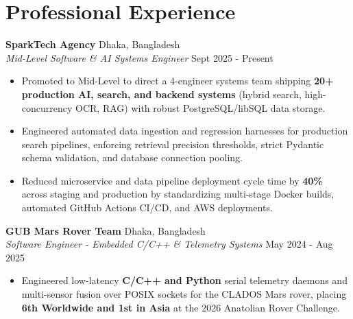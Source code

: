 \documentclass[9.5pt,a4paper]{article}
\begin{document}
\section*{Professional Experience}
\noindent
\textbf{SparkTech Agency} \hfill Dhaka, Bangladesh\\
\textit{Mid-Level Software & AI Systems Engineer} \hfill Sept 2025 - Present
\begin{itemize}
    \item Promoted to Mid-Level to direct a 4-engineer systems team shipping \textbf{20+ production AI, search, and backend systems} (hybrid search, high-concurrency OCR, RAG) with robust PostgreSQL/libSQL data storage.
    \item Engineered automated data ingestion and regression harnesses for production search pipelines, enforcing retrieval precision thresholds, strict Pydantic schema validation, and database connection pooling.
    \item Reduced microservice and data pipeline deployment cycle time by \textbf{40\%} across staging and production by standardizing multi-stage Docker builds, automated GitHub Actions CI/CD, and AWS deployments.
\end{itemize}
\vspace{0.6pt}
\noindent
\textbf{GUB Mars Rover Team} \hfill Dhaka, Bangladesh\\
\textit{Software Engineer - Embedded C/C++ & Telemetry Systems} \hfill May 2024 - Aug 2025
\begin{itemize}
    \item Engineered low-latency \textbf{C/C++ and Python} serial telemetry daemons and multi-sensor fusion over POSIX sockets for the CLADOS Mars rover, placing \textbf{6th Worldwide and 1st in Asia} at the 2026 Anatolian Rover Challenge.
\end{itemize}
\vspace{0.6pt}
\end{document}
